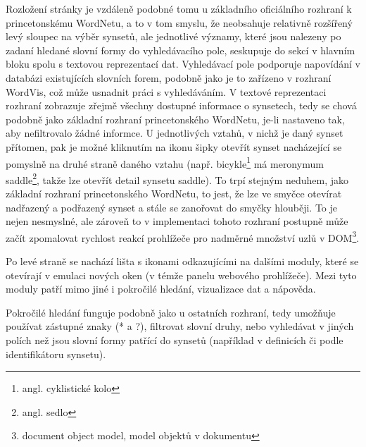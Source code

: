 \documentclass[a4paper, 11pt, oneside]{book}
\newcommand\ex{\textsf}
\begin{document}
					Rozložení stránky je vzdáleně podobné tomu u základního oficiálního rozhraní k princetonskému WordNetu, a to v tom smyslu, že neobsahuje relativně rozšířený levý sloupec na výběr synsetů, ale jednotlivé významy, které jsou nalezeny po zadaní hledané slovní formy do vyhledávacího pole, seskupuje do sekcí v hlavním bloku spolu s textovou reprezentací dat. Vyhledávací pole podporuje napovídání v databázi existujících slovních forem, podobně jako je to zařízeno v rozhraní WordVis, což může usnadnit práci s vyhledáváním. V textové reprezentaci rozhraní zobrazuje zřejmě všechny dostupné informace o synsetech, tedy se chová podobně jako základní rozhraní princetonského WordNetu, je-li nastaveno tak, aby nefiltrovalo žádné informce. U jednotlivých vztahů, v nichž je daný synset přítomen, pak je možné kliknutím na ikonu šipky otevřít synset nacházející se pomyslně na druhé straně daného vztahu (např. \ex{bicykle}\footnote{angl. \ex{cyklistické kolo}} má meronymum \ex{saddle}\footnote{angl. \ex{sedlo}}, takže lze otevřít detail synsetu \ex{saddle}). To trpí stejným neduhem, jako základní rozhraní princetonského WordNetu, to jest, že lze ve smyčce otevírat nadřazený a podřazený synset a stále se zanořovat do smyčky hlouběji. To je nejen nesmyslné, ale zároveň to v implementaci tohoto rozhraní postupně může začít zpomalovat rychlost reakcí prohlížeče pro nadměrné množství uzlů v DOM\footnote{document object model, model objektů v dokumentu}.

					Po levé straně se nachází lišta s ikonami odkazujícími na dalšími moduly, které se otevírají v emulaci nových oken (v témže panelu webového prohlížeče). Mezi tyto moduly patří mimo jiné i pokročilé hledání, vizualizace dat a nápověda. 

					Pokročilé hledání funguje podobně jako u ostatních rozhraní, tedy umožňuje používat zástupné znaky (\ex{*} a \ex{?}), filtrovat slovní druhy, nebo vyhledávat v jiných polích než jsou slovní formy patřící do synsetů (například v definicích či podle identifikátoru synsetu). 
\end{document}
